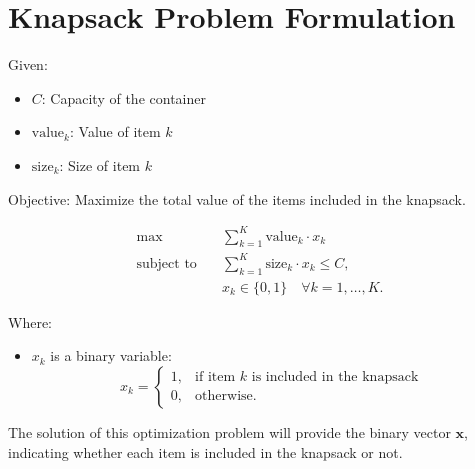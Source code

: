 \documentclass{article}
\begin{document}
\section*{Knapsack Problem Formulation}

Given:
\begin{itemize}
    \item \( C \): Capacity of the container
    \item \( \text{value}_k \): Value of item \( k \)
    \item \( \text{size}_k \): Size of item \( k \)
\end{itemize}

Objective: Maximize the total value of the items included in the knapsack.

\begin{align*}
\max\ & \sum_{k=1}^{K} \text{value}_k \cdot x_k \\
\text{subject to} \quad & \sum_{k=1}^{K} \text{size}_k \cdot x_k \leq C, \\
& x_k \in \{0, 1\} \quad \forall k = 1, \ldots, K.
\end{align*}

Where:
\begin{itemize}
    \item \( x_k \) is a binary variable: 
    \[
    x_k = 
    \begin{cases} 
    1, & \text{if item } k \text{ is included in the knapsack} \\ 
    0, & \text{otherwise.}
    \end{cases}
    \]
\end{itemize}

The solution of this optimization problem will provide the binary vector \(\mathbf{x}\), indicating whether each item is included in the knapsack or not.
\end{document}
